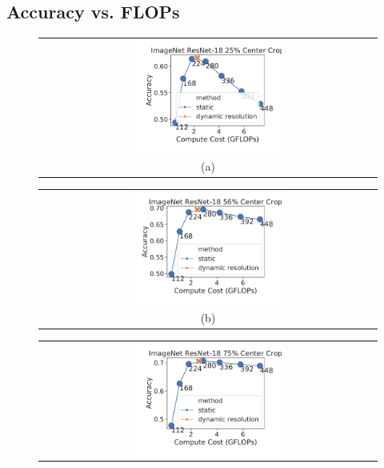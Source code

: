 \subsection{Accuracy vs. FLOPs}
\label{sec:accflops}
\begin{figure}[t]
    \centering
    \begin{tabular}{@{}c@{}}
    \includegraphics[width=0.45\textwidth]{e2e_figures/imagenet_resnet18_25_center.pdf} \\
    \small (a)
    \end{tabular}
    \begin{tabular}{@{}c@{}}
    \includegraphics[width=0.45\textwidth]{e2e_figures/imagenet_resnet18_56_center.pdf} \\
    \small (b)
    \end{tabular}
    \begin{tabular}{@{}c@{}}
    \includegraphics[width=0.45\textwidth]{e2e_figures/imagenet_resnet18_default_center.pdf} \\

\end{tabular}
\end{figure}
